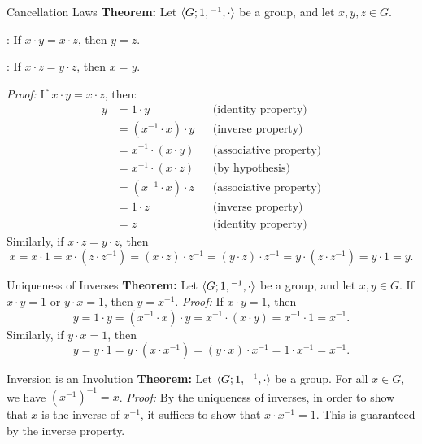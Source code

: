 \documentclass[12pt]{report}
\begin{document}
\begin{thmbox}{Cancellation Laws}
	\textbf{Theorem:} Let ${\langle {G; 1, {}^{-1}, \cdot} \rangle}$ be a group, and let $x, y, z \in G$.
	\begin{dfnitems}
		\item {}: If $x \cdot y = x \cdot z$, then $y = z$.
		\item {}: If $x \cdot z = y \cdot z$, then $x = y$.
	\end{dfnitems}
\tcblower
	\textit{Proof:} If $x \cdot y = x \cdot z$, then:
	\begin{align*}
		y & = 1 \cdot y                &  & \text{(identity property)}    \\
		  & = (x^{-1} \cdot x) \cdot y &  & \text{(inverse property)}     \\
		  & = x^{-1} \cdot (x \cdot y) &  & \text{(associative property)} \\
		  & = x^{-1} \cdot (x \cdot z) &  & \text{(by hypothesis)}        \\
		  & = (x^{-1} \cdot x) \cdot z &  & \text{(associative property)} \\
		  & = 1 \cdot z                &  & \text{(inverse property)}     \\
		  & = z                        &  & \text{(identity property)}
	\end{align*}
	Similarly, if $x \cdot z = y \cdot z$, then
	\[ x = x \cdot 1 = x \cdot (z \cdot z^{-1}) = (x \cdot z) \cdot z^{-1} = (y \cdot z) \cdot z^{-1} = y \cdot (z \cdot z^{-1}) = y \cdot 1 = y. \]
\end{thmbox}

\begin{thmbox}{Uniqueness of Inverses} \label{grpuniq}
	\textbf{Theorem:} Let ${\langle {G; 1, {}^{-1}, \cdot} \rangle}$ be a group, and let $x, y \in G$. If $x \cdot y = 1$ or $y \cdot x = 1$, then $y = x^{-1}$.
\tcblower
	\textit{Proof:} If $x \cdot y = 1$, then
	\[ y = 1 \cdot y = (x^{-1} \cdot x) \cdot y = x^{-1} \cdot (x \cdot y) = x^{-1} \cdot 1 = x^{-1}. \]
	Similarly, if $y \cdot x = 1$, then
	\[ y = y \cdot 1 = y \cdot (x \cdot x^{-1}) = (y \cdot x) \cdot x^{-1} = 1 \cdot x^{-1} = x^{-1}. \]
\end{thmbox}

\begin{thmbox}{Inversion is an Involution}
	\textbf{Theorem:} Let ${\langle {G; 1, {}^{-1}, \cdot} \rangle}$ be a group. For all $x \in G$, we have $(x^{-1})^{-1} = x$.
\tcblower
	\textit{Proof:} By the uniqueness of inverses, in order to show that $x$ is the inverse of $x^{-1}$, it suffices to show that $x \cdot x^{-1} = 1$. This is guaranteed by the inverse property.
\end{thmbox}
\end{document}
